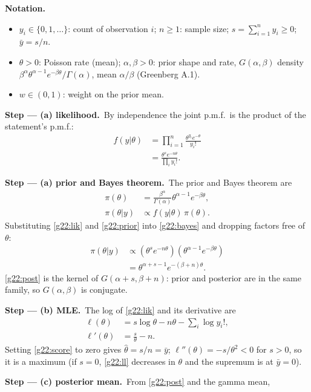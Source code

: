 \documentclass[11pt,a4paper]{article}
\newenvironment{notacao}{\par\smallskip\noindent\textbf{Notation.}\begin{itemize}[leftmargin=1.4em,topsep=1pt,itemsep=0pt]\small}{\end{itemize}}
\newcommand{\passo}[2]{\par\smallskip\noindent\textbf{Step --- #1.}~#2}
\begin{document}
\begin{sol}
\begin{notacao}
\item $y_i\in\{0,1,\ldots\}$: count of observation $i$; $n\ge1$: sample size; $s=\sum_{i=1}^n y_i\ge0$; $\bar y=s/n$.
\item $\theta>0$: Poisson rate (mean); $\alpha,\beta>0$: prior shape and rate, $G(\alpha,\beta)$ density $\beta^\alpha\theta^{\alpha-1}e^{-\beta\theta}/\Gamma(\alpha)$, mean $\alpha/\beta$ (Greenberg A.1).
\item $w\in(0,1)$: weight on the prior mean.
\end{notacao}
\passo{(a) likelihood}{By independence the joint p.m.f.\ is the product of the statement's p.m.f.:
\begin{align}
f(y|\theta)&=\prod_{i=1}^n\frac{\theta^{y_i}e^{-\theta}}{y_i!}\label{g22:l1}\\
&=\frac{\theta^{s}e^{-n\theta}}{\prod_{i}y_i!}.\label{g22:lik}
\end{align}}
\passo{(a) prior and Bayes theorem}{The prior and Bayes theorem are
\begin{align}
\pi(\theta)&=\frac{\beta^\alpha}{\Gamma(\alpha)}\theta^{\alpha-1}e^{-\beta\theta},\label{g22:prior}\\
\pi(\theta|y)&\propto f(y|\theta)\,\pi(\theta).\label{g22:bayes}
\end{align}
Substituting \eqref{g22:lik} and \eqref{g22:prior} into \eqref{g22:bayes} and dropping factors free of $\theta$:
\begin{align}
\pi(\theta|y)&\propto\left(\theta^{s}e^{-n\theta}\right)\left(\theta^{\alpha-1}e^{-\beta\theta}\right)\label{g22:p1}\\
&=\theta^{\alpha+s-1}e^{-(\beta+n)\theta}.\label{g22:post}
\end{align}
\eqref{g22:post} is the kernel of $G(\alpha+s,\beta+n)$: prior and posterior are in the same family, so $G(\alpha,\beta)$ is conjugate.}
\passo{(b) MLE}{The log of \eqref{g22:lik} and its derivative are
\begin{align}
\ell(\theta)&=s\log\theta-n\theta-\textstyle\sum_i\log y_i!,\label{g22:ll}\\
\ell'(\theta)&=\frac{s}{\theta}-n.\label{g22:score}
\end{align}
Setting \eqref{g22:score} to zero gives $\hat\theta=s/n=\bar y$; $\ell''(\theta)=-s/\theta^2<0$ for $s>0$, so it is a maximum (if $s=0$, \eqref{g22:ll} decreases in $\theta$ and the supremum is at $\bar y=0$).}
\passo{(c) posterior mean}{From \eqref{g22:post} and the gamma mean,
}
\end{sol}
\end{document}
